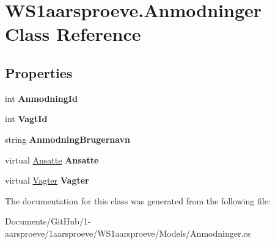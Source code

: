 \hypertarget{class_w_s1aarsproeve_1_1_anmodninger}{}\section{W\+S1aarsproeve.\+Anmodninger Class Reference}
\label{class_w_s1aarsproeve_1_1_anmodninger}
\subsection*{Properties}
\begin{DoxyCompactItemize}
\item 
\hypertarget{class_w_s1aarsproeve_1_1_anmodninger_a8814eab118638cf2f13bc0022542d6ae}{}int {\bfseries Anmodning\+Id}\label{class_w_s1aarsproeve_1_1_anmodninger_a8814eab118638cf2f13bc0022542d6ae}

\item 
\hypertarget{class_w_s1aarsproeve_1_1_anmodninger_ab349aa026194fa7ece2c9950da569cb6}{}int {\bfseries Vagt\+Id}\label{class_w_s1aarsproeve_1_1_anmodninger_ab349aa026194fa7ece2c9950da569cb6}

\item 
\hypertarget{class_w_s1aarsproeve_1_1_anmodninger_aafad11a7bcf696e0b86986b7e9211664}{}string {\bfseries Anmodning\+Brugernavn}\label{class_w_s1aarsproeve_1_1_anmodninger_aafad11a7bcf696e0b86986b7e9211664}

\item 
\hypertarget{class_w_s1aarsproeve_1_1_anmodninger_a7b74a452c626d939348d4623d9784d43}{}virtual \hyperlink{class_w_s1aarsproeve_1_1_ansatte}{Ansatte} {\bfseries Ansatte}\label{class_w_s1aarsproeve_1_1_anmodninger_a7b74a452c626d939348d4623d9784d43}

\item 
\hypertarget{class_w_s1aarsproeve_1_1_anmodninger_af92d010a20fdd469bbb0c53b8af33261}{}virtual \hyperlink{class_w_s1aarsproeve_1_1_vagter}{Vagter} {\bfseries Vagter}\label{class_w_s1aarsproeve_1_1_anmodninger_af92d010a20fdd469bbb0c53b8af33261}

\end{DoxyCompactItemize}


The documentation for this class was generated from the following file\+:\begin{DoxyCompactItemize}
\item 
Documents/\+Git\+Hub/1-\/aarsproeve/1aarsproeve/\+W\+S1aarsproeve/\+Models/Anmodninger.\+cs\end{DoxyCompactItemize}
